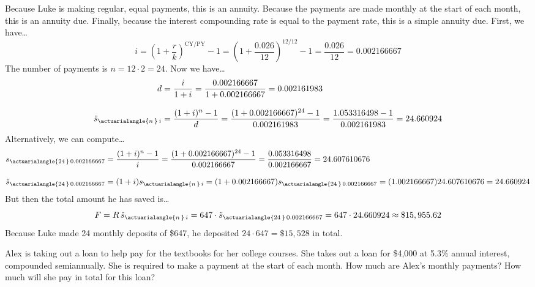 \documentclass[11pt,letterpaper]{article}
\begin{document}
\sol Because Luke is making regular, equal payments, this is an annuity. Because the payments are made monthly at the start of each month, this is an annuity due. Finally, because the interest compounding rate is equal to the payment rate, this is a simple annuity due. First, we have\dots
	\[
	i= \left(1 + \dfrac{r}{k} \right)^{\text{CY}/\text{PY}} - 1= \left(1 + \dfrac{0.026}{12} \right)^{12/12} - 1= \dfrac{0.026}{12}= 0.002166667
	\]
The number of payments is $n= 12 \cdot 2= 24$. Now we have\dots
	\[
	\begin{aligned}
	d&= \dfrac{i}{1 + i}= \dfrac{0.002166667}{1 + 0.002166667}= 0.002161983 \\[0.3cm]
	\ddot{s}_{\actuarialangle{n\,}\, i}&= \dfrac{(1 + i)^n - 1}{d}= \dfrac{(1 + 0.002166667)^{24} - 1}{0.002161983}= \dfrac{1.053316498 - 1}{0.002161983}= 24.660924
	\end{aligned}
	\]
Alternatively, we can compute\dots
	\[
	\begin{aligned}
	s_{\actuarialangle{24\,}\, 0.002166667}&= \dfrac{(1 + i)^n - 1}{i}= \dfrac{(1 + 0.002166667)^{24} - 1}{0.002166667}= \dfrac{0.053316498}{0.002166667}= 24.607610676 \\[0.3cm]
	\ddot{s}_{\actuarialangle{24\,}\, 0.002166667}&= (1 + i) s_{\actuarialangle{n\,}\, i}= (1 + 0.002166667) s_{\actuarialangle{24\,}\, 0.002166667}= (1.002166667) 24.607610676= 24.660924
	\end{aligned}
	\]
But then the total amount he has saved is\dots
	\[
	F= R\, \ddot{s}_{\actuarialangle{n\,}\, i}= 647 \cdot \ddot{s}_{\actuarialangle{24\,}\, 0.002166667}= 647 \cdot 24.660924 \approx \$15,955.62
	\]
Because Luke made 24 monthly deposits of \$647, he deposited $24 \cdot 647= \$15,528$ in total. 



\newpage



 Alex is taking out a loan to help pay for the textbooks for her college courses. She takes out a loan for \$4,000 at 5.3\% annual interest, compounded semiannually. She is required to make a payment at the start of each month. How much are Alex's monthly payments? How much will she pay in total for this loan? \pspace
\end{document}
